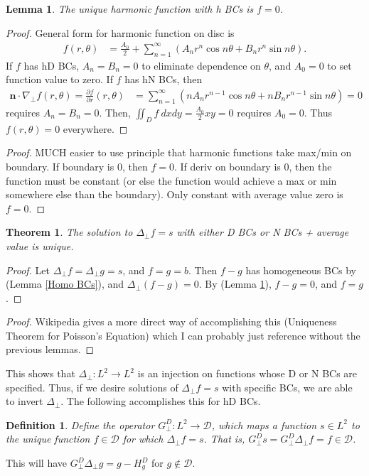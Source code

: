 \documentclass{article}
\newtheorem{theorem}{Theorem}
\newtheorem{lemma}{Lemma}
\newtheorem{definition}{Definition}
\newcommand{\np}{\nabla_\perp}
\newcommand{\lap}{\Delta_\perp}
\newcommand{\p}{\partial}
\newcommand{\deriv}[2]{\frac{\p #1}{\p #2}}
\newcommand{\GD}{G_\perp^D}
\newcommand{\pth} [1] {\left( #1 \right) }
\begin{document}
\begin{lemma} \label{Homo Harmonic}
    The unique harmonic function with h BCs is $f=0$. 
\end{lemma}
\begin{proof}
    General form for harmonic function on disc is 
    \begin{align}
        f(r,\theta) &= \frac{A_0}{2} + \sum_{n=1}^\infty \pth{ A_nr^n\cos n\theta + B_nr^n\sin n\theta}.
    \end{align}
    If $f$ has hD BCs, $A_n=B_n=0$ to eliminate dependence on $\theta$, and $A_0=0$ to set function value to zero. If $f$ has hN BCs, then 
    \begin{align}
        \bm{n}\cdot\np f(r,\theta) = \deriv{f}{r}(r,\theta) &= \sum_{n=1}^\infty \pth{ nA_nr^{n-1} \cos n\theta + nB_nr^{n-1}\sin n\theta} = 0
    \end{align}
    requires $A_n=B_n=0$. Then, $\iint_D f\ dxdy = \frac{A_0}{2}xy = 0$ requires $A_0=0$. Thus $f(r,\theta)=0$ everywhere. 
\end{proof}
\begin{proof}
    MUCH easier to use principle that harmonic functions take max/min on boundary. If boundary is 0, then $f=0$. If deriv on boundary is 0, then the function must be constant (or else the function would achieve a max or min somewhere else than the boundary). Only constant with average value zero is $f=0$. 
\end{proof}

\begin{theorem} \label{Unique Laplace}
    The solution to $\lap f=s$ with either D BCs or N BCs + average value is unique. 
\end{theorem}
\begin{proof}
    Let $\lap f=\lap g=s$, and $f=g=b$. Then $f-g$ has homogeneous BCs by (Lemma \ref{Homo BCs}), and $\lap(f-g)=0$. By (Lemma \ref{Homo Harmonic}), $f-g=0$, and $f=g$. 
\end{proof}
\begin{proof}
    Wikipedia gives a more direct way of accomplishing this (Uniqueness Theorem for Poisson's Equation) which I can probably just reference without the previous lemmas. 
\end{proof}
This shows that $\lap:L^2\to L^2$ is an injection on functions whose D or N BCs are specified. Thus, if we desire solutions of $\lap f=s$ with specific BCs, we are able to invert $\lap$. The following accomplishes this for hD BCs. 

\begin{definition}
    Define the operator $\GD:L^2\to\mathcal{D}$, which maps a function $s\in L^2$ to the unique function $f\in\mathcal{D}$ for which $\lap f=s$. That is, $\GD s = \GD\lap f=f\in\mathcal{D}$. 
\end{definition}
This will have $\GD\lap g = g-H^D_g$ for $g\notin\mathcal{D}$.
\end{document}
